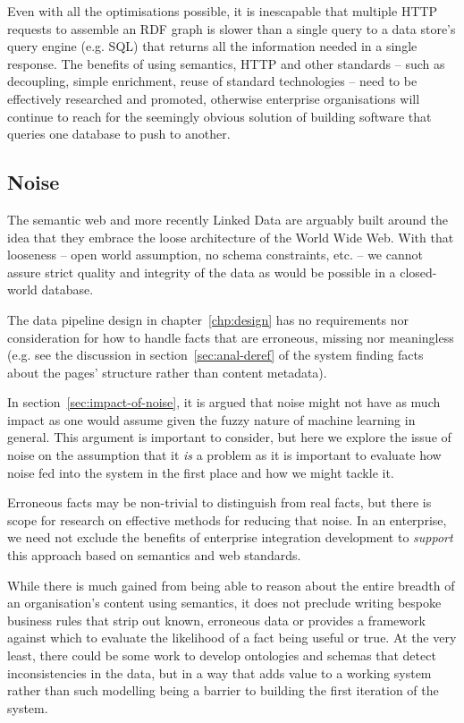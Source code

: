 Even with all the optimisations possible, it is inescapable that
multiple HTTP requests to assemble an RDF graph is slower than a
single query to a data store's query engine (e.g. SQL) that returns
all the information needed in a single response. The benefits of using
semantics, HTTP and other standards -- such as decoupling, simple
enrichment, reuse of standard technologies -- need to be effectively
researched and promoted, otherwise enterprise organisations will
continue to reach for the seemingly obvious solution of building
software that queries one database to push to another.

\subsection{Noise}

The semantic web and more recently Linked Data are arguably built
around the idea that they embrace the loose architecture of the
World Wide Web. With that looseness -- open world assumption,
no schema constraints, etc. -- we cannot assure strict quality and
integrity of the data as would be possible in a closed-world
database.

The data pipeline design in chapter~\ref{chp:design} has no
requirements nor consideration for how to handle facts that are
erroneous, missing nor meaningless (e.g. see the discussion
in section~\ref{sec:anal-deref} of the system finding facts about the
pages' structure rather than content metadata).

In section~\ref{sec:impact-of-noise}, it is argued that noise might
not have as much impact as one would assume given the fuzzy nature
of machine learning in general. This argument is important to consider,
but here we explore the issue of noise on the assumption that it
\emph{is} a problem as it is important to evaluate how noise fed into
the system in the first place and how we might tackle it.

Erroneous facts may be non-trivial to distinguish from real facts, but
there is scope for research on effective methods for reducing that
noise. In an enterprise, we need not exclude the benefits of
enterprise integration development to \emph{support} this approach
based on semantics and web standards.

While there is much gained
from being able to reason about the entire breadth of an organisation's
content using semantics, it does not preclude writing bespoke business
rules that strip out known, erroneous data or provides a framework
against which to evaluate the likelihood of a fact being useful or
true. At the very least, there could be some work to develop ontologies
and schemas that detect inconsistencies in the data, but in a way
that adds value to a working system rather than such modelling being a
barrier to building the first iteration of the system.

